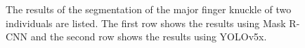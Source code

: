 \begin{figure}[h]
{        \label{}}

    \caption{The results of the segmentation of the major finger knuckle of two individuals are listed. The first row shows the results using Mask R-CNN and the second row shows the results using YOLOv5x.}
    \label{segmentation}
\end{figure}


